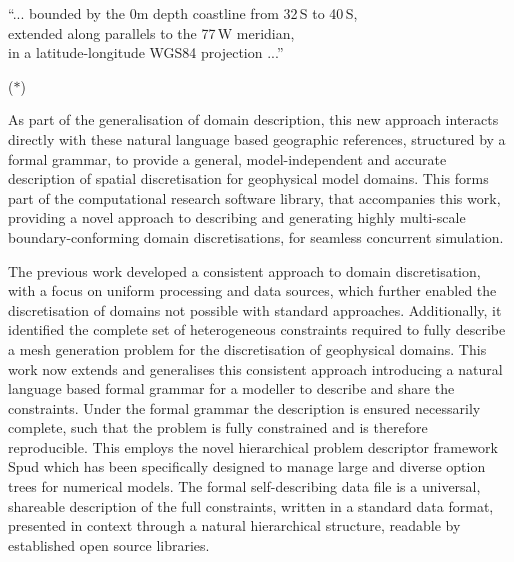 \documentclass[a4paper, 10pt]{book}
\providecommand{\refdescriptionquote}{($\ast$)\xspace}
\newenvironment{descriptionquote}{%
    \setlength{\parskip}{4pt}
    \setlength{\parsep}{0pt}
    \medskip\par\noindent%
    \hspace{0.25\columnwidth}%
    \begin{minipage}{0.6\columnwidth}%
    \itshape%
  }{%
    \end{minipage}%
    \hfill\refdescriptionquote%
    \medskip\par\noindent%
    \ignorespacesafterend%
  }
\begin{document}
\begin{descriptionquote}
\hypertarget{description}{}
``... 
bounded by the 0m depth coastline from 32\,\degree S to 40\,\degree S,
\\[2pt]\phantom{``... \!}
extended along parallels to the 77\,\degree W meridian,
\\[2pt]\phantom{``... \!}
in a latitude-longitude WGS84 projection ...''
\label{description}
\end{descriptionquote}


As part of the generalisation of domain description, this new approach interacts directly with these natural language based
geographic
references,
structured by a formal grammar,
to provide a general, model-independent and accurate description of spatial discretisation for geophysical model domains.
%
This forms part of the \cite{shingle} computational research software library, that accompanies this work, providing a novel approach to describing and generating highly multi-scale boundary-conforming domain discretisations, for seamless concurrent simulation.

The previous work \cite{candybrep}
developed a consistent approach to domain discretisation, 
with a focus on uniform processing and data sources, which further enabled the discretisation of domains not possible with standard approaches.
%
Additionally, it identified the complete set of heterogeneous constraints required to fully describe a mesh generation problem for the discretisation of geophysical domains.
%
This work now extends and generalises this consistent approach introducing a natural language based formal grammar for a modeller to describe and share the constraints.
Under the formal grammar the description is ensured necessarily complete,
such that the problem is fully constrained and is therefore reproducible.
This employs the
novel hierarchical problem descriptor
framework
Spud \citep{ham09} which has been specifically designed to manage large and diverse option trees for numerical models.
%
The formal self-describing data file is a universal, shareable description of the full constraints, written in a standard data format, presented in context through a natural hierarchical structure, readable by established open source libraries.
%
\end{document}
